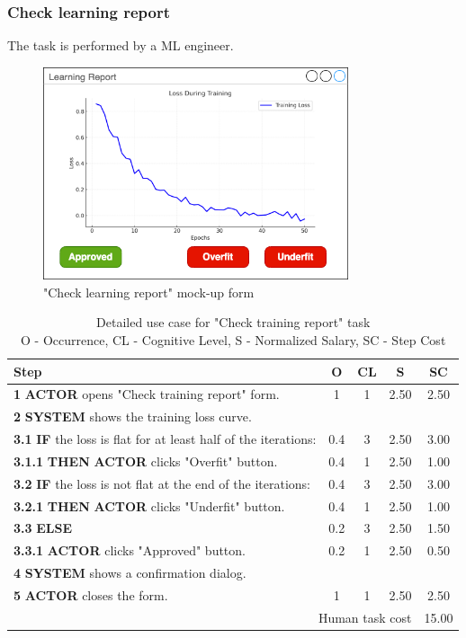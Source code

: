 \subsubsection{Check learning report}

The task is performed by a ML engineer.

\begin{figure}[H]
\centering
\includegraphics[width=0.8\textwidth]{figures/check_learning_report.png}
\caption{"Check learning report" mock-up form}
\end{figure}

\begin{table}[H]
\centering
\begin{tabularx}{\textwidth}{|X|c|c|c|c|}
\hline
\textbf{Step} & \textbf{O} & \textbf{CL} & \textbf{S} & \textbf{SC} \\
\hline
\textbf{1} \textbf{ACTOR} opens "Check training report" form. & 1 & 1 & 2.50 & 2.50 \\
\hline
\textbf{2} \textbf{SYSTEM} shows the training loss curve. & & & & \\
\hline
\textbf{3.1} \textbf{IF} the loss is flat for at least half of the iterations: & 0.4 & 3 & 2.50 & 3.00 \\
\hline
\textbf{3.1.1} \textbf{THEN} \textbf{ACTOR} clicks "Overfit" button. & 0.4 & 1 & 2.50 & 1.00 \\
\hline
\textbf{3.2} \textbf{IF} the loss is not flat at the end of the iterations: & 0.4 & 3 & 2.50 & 3.00 \\
\hline
\textbf{3.2.1} \textbf{THEN} \textbf{ACTOR} clicks "Underfit" button. & 0.4 & 1 & 2.50 & 1.00 \\
\hline
\textbf{3.3} \textbf{ELSE} & 0.2 & 3 & 2.50 & 1.50 \\
\hline
\textbf{3.3.1} \textbf{ACTOR} clicks "Approved" button. & 0.2 & 1 & 2.50 & 0.50 \\
\hline
\textbf{4} \textbf{SYSTEM} shows a confirmation dialog. & & & & \\
\hline
\textbf{5} \textbf{ACTOR} closes the form. & 1 & 1 & 2.50 & 2.50 \\
\hline
\multicolumn{4}{|r|}{Human task cost} & 15.00 \\
\hline
\end{tabularx}
\caption{Detailed use case for "Check training report" task\\ 
O - Occurrence, CL - Cognitive Level, S - Normalized Salary, SC - Step Cost}
\label{table:check_training_report}
\end{table}

